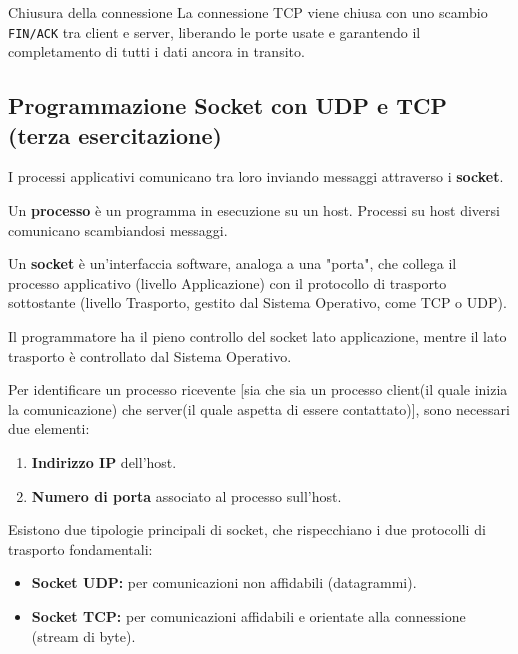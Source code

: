 \documentclass[a4paper,12pt]{report}
\begin{document}
\begin{notebox}{Chiusura della connessione}
La connessione TCP viene chiusa con uno scambio \texttt{FIN/ACK} tra client e server, liberando le porte usate e garantendo il completamento di tutti i dati ancora in transito.
\end{notebox}


\subsection{Programmazione Socket con UDP e TCP (terza esercitazione)}

I processi applicativi comunicano tra loro inviando messaggi attraverso i \textbf{socket}.

Un \textbf{processo} è un programma in esecuzione su un host. Processi su host diversi comunicano scambiandosi messaggi.

Un \textbf{socket} è un'interfaccia software, analoga a una "porta", che collega il processo applicativo (livello Applicazione) con il protocollo di trasporto sottostante (livello Trasporto, gestito dal Sistema Operativo, come TCP o UDP).


Il programmatore ha il pieno controllo del socket lato applicazione, mentre il lato trasporto è controllato dal Sistema Operativo.
\vspace{0.5cm}


Per identificare un processo ricevente [sia che sia un processo client(il quale inizia la comunicazione) che server(il quale aspetta di essere contattato)], sono necessari due elementi:
\begin{enumerate}
    \item \textbf{Indirizzo IP} dell'host.
    \item \textbf{Numero di porta} associato al processo sull'host.
\end{enumerate}

\vspace{0.5cm}
Esistono due tipologie principali di socket, che rispecchiano i due protocolli di trasporto fondamentali:

\begin{itemize}
    \item \textbf{Socket UDP:} per comunicazioni non affidabili (datagrammi).
    \item \textbf{Socket TCP:} per comunicazioni affidabili e orientate alla connessione (stream di byte).
\end{itemize}
\end{document}

